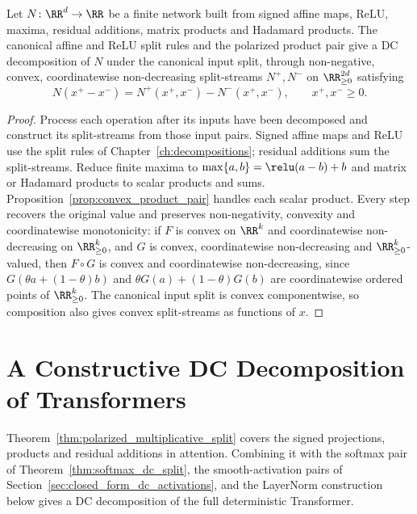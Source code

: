\begin{theoremenv}\label{thm:polarized_multiplicative_split}
Let $N\colon\RR^d\to\RR$ be a finite network built from signed affine maps, ReLU, maxima, residual additions, matrix products and Hadamard products. The canonical affine and ReLU split rules and the polarized product pair give a DC decomposition of $N$ under the canonical input split, through non-negative, convex, coordinatewise non-decreasing split-streams $N^+,N^-$ on $\RR^{2d}_{\ge0}$ satisfying
\begin{equation}\label{eq:multiplicative_dc_recovery}
    N(x^+-x^-)=N^+(x^+,x^-)-N^-(x^+,x^-),\qquad x^+,x^-\ge0.
\end{equation}
\end{theoremenv}
\begin{proof}
Process each operation after its inputs have been decomposed and construct its split-streams from those input pairs. Signed affine maps and ReLU use the split rules of Chapter~\ref{ch:decompositions}; residual additions sum the split-streams. Reduce finite maxima to $\max\{a,b\}=\relu(a-b)+b$ and matrix or Hadamard products to scalar products and sums. Proposition~\ref{prop:convex_product_pair} handles each scalar product. Every step recovers the original value and preserves non-negativity, convexity and coordinatewise monotonicity: if $F$ is convex on $\RR^k$ and coordinatewise non-decreasing on $\RR^k_{\ge0}$, and $G$ is convex, coordinatewise non-decreasing and $\RR^k_{\ge0}$-valued, then $F\circ G$ is convex and coordinatewise non-decreasing, since $G(\theta a+(1-\theta)b)$ and $\theta G(a)+(1-\theta)G(b)$ are coordinatewise ordered points of $\RR^k_{\ge0}$. The canonical input split is convex componentwise, so composition also gives convex split-streams as functions of $x$.
\end{proof}

\section{A Constructive DC Decomposition of Transformers}\label{sec:transformer_dc}

Theorem~\ref{thm:polarized_multiplicative_split} covers the signed projections, products and residual additions in attention. Combining it with the softmax pair of Theorem~\ref{thm:softmax_dc_split}, the smooth-activation pairs of Section~\ref{sec:closed_form_dc_activations}, and the LayerNorm construction below gives a DC decomposition of the full deterministic Transformer.

